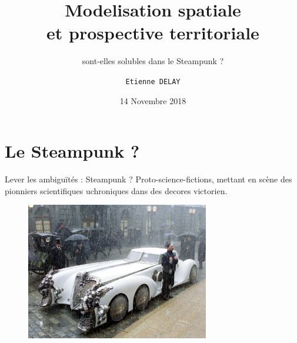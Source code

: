 \documentclass[newPxFont]{beamer}
\title{Modelisation spatiale \\et prospective territoriale}
\subtitle{sont-elles solubles dans le Steampunk ?}
\date{14 Novembre 2018}
\author{\texttt{Etienne DELAY}}
\institute{UR GREEN}
\begin{document}
%
%

\maketitle


%
%

\section{Le Steampunk ?}


\begin{frame}[c]{Lever les ambiguïtés : Steampunk ? }
  \vspace{-1cm}
  Proto-science-fictions, mettant en scène des pionniers scientifiques uchroniques dans des decores victorien.
  \begin{figure}
    \includegraphics[height=6cm]{img/a_steampunk_car.jpg}
  \end{figure}
\end{frame}
\end{document}
